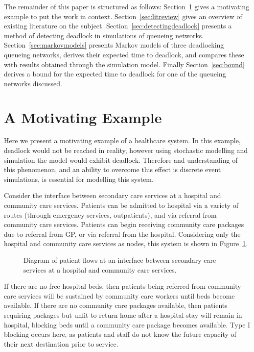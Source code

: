 \documentclass{article}
\numberwithin{equation}{section}
\begin{document}
The remainder of this paper is structured as follows:
Section~\ref{sec:motivatingexample} gives a motivating example to put the work
in context.
Section~\ref{sec:litreview} gives an overview of existing literature on the
subject.
Section~\ref{sec:detectingdeadlock} presents a method of detecting deadlock in
simulations of queueing networks.
Section~\ref{sec:markovmodels} presents Markov models of three deadlocking
queueing networks, derives their expected time to deadlock, and compares these
with results obtained through the simulation model.
Finally Section~\ref{sec:bound} derives a bound for the expected time to
deadlock for one of the queueing networks discussed.




\section{A Motivating Example}\label{sec:motivatingexample}

Here we present a motivating example of a healthcare system.
In this example, deadlock would not be reached in reality, however using
stochastic modelling and simulation the model would exhibit deadlock.
Therefore and understanding of this phenomenon, and an ability to overcome
this effect is discrete event simulations, is essential for modelling this
system.

Consider the interface between secondary care services at a hospital and
community care services.
Patients can be admitted to hospital via a variety of routes (through
emergency services, outpatients), and via referral from community care
services.
Patients can begin receiving community care packages due to referral from GP,
or via referral from the hospital.
Considering only the hospital and community care services as nodes, this
system is shown in Figure~\ref{fig:motivatingexample}.

\begin{figure}
\begin{center}

\end{center}
\caption{Diagram of patient flows at an interface between secondary care
services at a hospital and community care services.}
\label{fig:motivatingexample}
\end{figure}

If there are no free hospital beds, then patients being referred from
community care services will be sustained by community care workers until beds
become available.
If there are no community care packages available, then patients requiring
packages but unfit to return home after a hospital stay will remain in
hospital, blocking beds until a community care package becomes available.
Type I blocking occurs here, as patients and staff do not know the future
capacity of their next destination prior to service.
\end{document}
